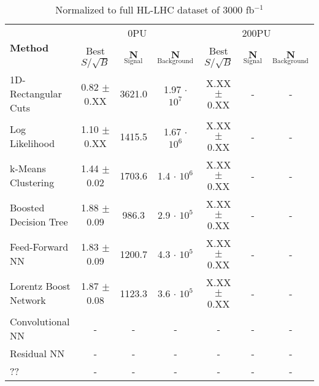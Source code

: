 \documentclass{article}
\begin{document}
\begin{table}[h!]
  \hskip-4.0cm
    \begin{tabular}{|l|c|c|c|c|c|c|} %
      \hline\hline
      \multirow{2}{*}{\textbf{Method}} & \multicolumn{3}{c|}{0PU} & \multicolumn{3}{c|}{200PU}\\
      \cline{2-7}
      & Best $S/\sqrt{B}$ & \textbf{N$_{\mathrm{Signal}}$} & \textbf{N$_{\mathrm{Background}}$} & Best $S/\sqrt{B}$ & \textbf{N$_{\mathrm{Signal}}$} & \textbf{N$_{\mathrm{Background}}$}\\
      \hline
      1D-Rectangular Cuts   & 0.82 $\pm$ 0.XX & 3621.0 & 1.97 $\cdot$ $10^7$ & X.XX $\pm$ 0.XX & - & -\\
      Log Likelihood        & 1.10 $\pm$ 0.XX & 1415.5 & 1.67 $\cdot$ $10^6$ & X.XX $\pm$ 0.XX & - & - \\
      k-Means Clustering    & 1.44 $\pm$ 0.02 & 1703.6 & 1.4 $\cdot$ $10^6$ & X.XX $\pm$ 0.XX & - & - \\
      Boosted Decision Tree & 1.88 $\pm$ 0.09 & 986.3  & 2.9 $\cdot$ $10^5$ & X.XX $\pm$ 0.XX & - & - \\
      Feed-Forward NN       & 1.83 $\pm$ 0.09 & 1200.7 & 4.3 $\cdot$ $10^5$ & X.XX $\pm$ 0.XX & - & - \\
      Lorentz Boost Network & 1.87 $\pm$ 0.08 & 1123.3 & 3.6 $\cdot$ $10^5$ & X.XX $\pm$ 0.XX & - & - \\
      Convolutional NN & - & - & - & - & - & - \\                          
      Residual NN & - & - & - & - & - & - \\
      ?? & - & - & - & - & - & - \\
      \hline\hline
    \end{tabular}
    \caption{Normalized to full HL-LHC dataset of 3000 fb$^{-1}$}
\end{table}
\end{document}
